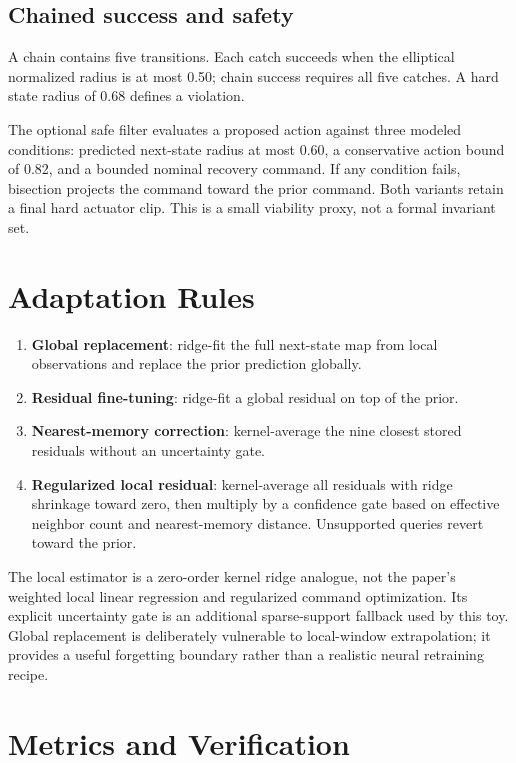 \documentclass[11pt]{article}
\begin{document}
\subsection{Chained success and safety}

A chain contains five transitions. Each catch succeeds when the elliptical normalized radius is at most 0.50; chain success requires all five catches. A hard state radius of 0.68 defines a violation.

The optional safe filter evaluates a proposed action against three modeled conditions: predicted next-state radius at most 0.60, a conservative action bound of 0.82, and a bounded nominal recovery command. If any condition fails, bisection projects the command toward the prior command. Both variants retain a final hard actuator clip. This is a small viability proxy, not a formal invariant set.

\section{Adaptation Rules}

\begin{enumerate}[leftmargin=1.5em]
  \item \textbf{Global replacement}: ridge-fit the full next-state map from local observations and replace the prior prediction globally.
  \item \textbf{Residual fine-tuning}: ridge-fit a global residual on top of the prior.
  \item \textbf{Nearest-memory correction}: kernel-average the nine closest stored residuals without an uncertainty gate.
  \item \textbf{Regularized local residual}: kernel-average all residuals with ridge shrinkage toward zero, then multiply by a confidence gate based on effective neighbor count and nearest-memory distance. Unsupported queries revert toward the prior.
\end{enumerate}

The local estimator is a zero-order kernel ridge analogue, not the paper's weighted local linear regression and regularized command optimization. Its explicit uncertainty gate is an additional sparse-support fallback used by this toy. Global replacement is deliberately vulnerable to local-window extrapolation; it provides a useful forgetting boundary rather than a realistic neural retraining recipe.

\section{Metrics and Verification}
\end{document}
